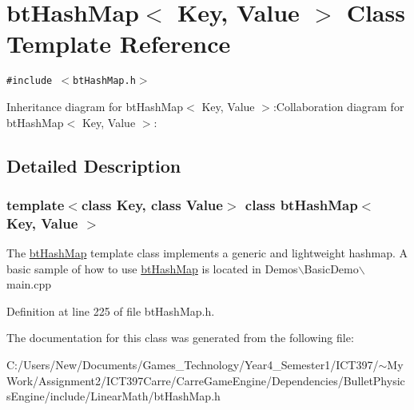 \hypertarget{classbt_hash_map}{
\section{btHashMap$<$ Key, Value $>$ Class Template Reference}
\label{classbt_hash_map}
}
{\tt \#include $<$btHashMap.h$>$}

Inheritance diagram for btHashMap$<$ Key, Value $>$:Collaboration diagram for btHashMap$<$ Key, Value $>$:

\subsection{Detailed Description}
\subsubsection*{template$<$class Key, class Value$>$ class btHashMap$<$ Key, Value $>$}

The \hyperlink{classbt_hash_map}{btHashMap} template class implements a generic and lightweight hashmap. A basic sample of how to use \hyperlink{classbt_hash_map}{btHashMap} is located in Demos$\backslash$BasicDemo$\backslash$main.cpp 

Definition at line 225 of file btHashMap.h.

The documentation for this class was generated from the following file:\begin{CompactItemize}
\item 
C:/Users/New/Documents/Games\_\-Technology/Year4\_\-Semester1/ICT397/$\sim$My Work/Assignment2/ICT397Carre/CarreGameEngine/Dependencies/BulletPhysicsEngine/include/LinearMath/btHashMap.h\end{CompactItemize}
